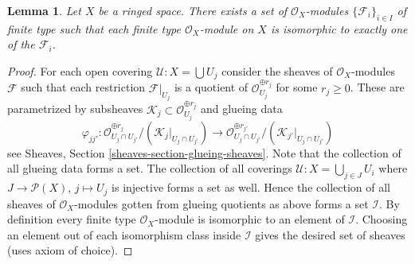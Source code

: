\documentclass[10pt,a4paper]{amsart}
\theoremstyle{plain}
\newtheorem{lemma}[subsection]{Lemma}
\theoremstyle{definition}
\theoremstyle{remark}
\numberwithin{equation}{subsection}
\begin{document}
\begin{lemma}
\label{lemma-set-isomorphism-classes-finite-type-modules}
Let $X$ be a ringed space.
There exists a set of $\mathcal{O}_X$-modules
$\{\mathcal{F}_i\}_{i \in I}$ of finite type
such that each finite type $\mathcal{O}_X$-module
on $X$ is isomorphic to exactly one of the $\mathcal{F}_i$.
\end{lemma}

\begin{proof}
For each open covering $\mathcal{U} : X = \bigcup U_j$ consider the
sheaves of $\mathcal{O}_X$-modules $\mathcal{F}$ such that each
restriction $\mathcal{F}|_{U_j}$ is a quotient of
$\mathcal{O}_{U_j}^{\oplus r_j}$ for some $r_j \geq 0$.
These are parametrized by subsheaves
$\mathcal{K}_j \subset \mathcal{O}_{U_j}^{\oplus r_j}$ and glueing
data
$$
\varphi_{jj'} :
\mathcal{O}_{U_j \cap U_{j'}}^{\oplus r_j}/
(\mathcal{K}_j|_{U_j \cap U_{j'}})
\longrightarrow
\mathcal{O}_{U_j \cap U_{j'}}^{\oplus r_{j'}}/
(\mathcal{K}_{j'}|_{U_j \cap U_{j'}})
$$
see Sheaves, Section \ref{sheaves-section-glueing-sheaves}.
Note that the collection of all glueing data forms a set.
The collection of all coverings $\mathcal{U} : X = \bigcup_{j \in J} U_i$
where $J \to \mathcal{P}(X)$, $j \mapsto U_j$ is injective forms a set as
well. Hence the collection of all sheaves of $\mathcal{O}_X$-modules
gotten from glueing quotients as above forms a set $\mathcal{I}$.
By definition every finite type $\mathcal{O}_X$-module
is isomorphic to an element of $\mathcal{I}$. Choosing an
element out of each isomorphism class inside $\mathcal{I}$
gives the desired set of sheaves (uses axiom of choice).
\end{proof}
\end{document}
